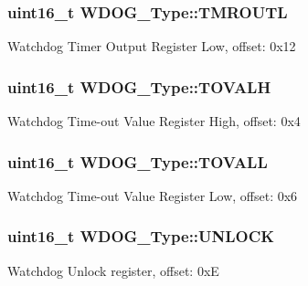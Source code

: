 \subsubsection[{\texorpdfstring{T\+M\+R\+O\+U\+TL}{TMROUTL}}]{ uint16\+\_\+t W\+D\+O\+G\+\_\+\+Type\+::\+T\+M\+R\+O\+U\+TL}\hypertarget{structWDOG__Type_ad2297941f143a2e12377e57a3281e0f8}{}\label{structWDOG__Type_ad2297941f143a2e12377e57a3281e0f8}
Watchdog Timer Output Register Low, offset\+: 0x12 
\subsubsection[{\texorpdfstring{T\+O\+V\+A\+LH}{TOVALH}}]{ uint16\+\_\+t W\+D\+O\+G\+\_\+\+Type\+::\+T\+O\+V\+A\+LH}\hypertarget{structWDOG__Type_ad21f1f265d08c252fb57e35399af5e4d}{}\label{structWDOG__Type_ad21f1f265d08c252fb57e35399af5e4d}
Watchdog Time-\/out Value Register High, offset\+: 0x4 
\subsubsection[{\texorpdfstring{T\+O\+V\+A\+LL}{TOVALL}}]{ uint16\+\_\+t W\+D\+O\+G\+\_\+\+Type\+::\+T\+O\+V\+A\+LL}\hypertarget{structWDOG__Type_a3f94863d1793cd3c49bf604407d57a1f}{}\label{structWDOG__Type_a3f94863d1793cd3c49bf604407d57a1f}
Watchdog Time-\/out Value Register Low, offset\+: 0x6 
\subsubsection[{\texorpdfstring{U\+N\+L\+O\+CK}{UNLOCK}}]{ uint16\+\_\+t W\+D\+O\+G\+\_\+\+Type\+::\+U\+N\+L\+O\+CK}\hypertarget{structWDOG__Type_ac74551f3b44a50f8c6cd440d68a943f5}{}\label{structWDOG__Type_ac74551f3b44a50f8c6cd440d68a943f5}
Watchdog Unlock register, offset\+: 0xE 
